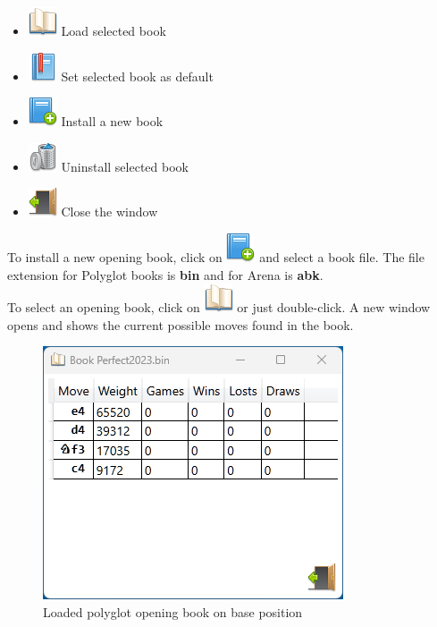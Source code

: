 \documentclass[11pt,a4paper]{article}
\begin{document}
	\begin{itemize}
		\item \includegraphics[scale=0.5]{book_open.png} Load selected book
		\item \includegraphics[scale=0.5]{bookmark.png} Set selected book as default
		\item \includegraphics[scale=0.5]{book_add.png} Install a new book
		\item \includegraphics[scale=0.5]{bin.png} Uninstall selected book
		\item \includegraphics[scale=0.5]{door_out.png} Close the window
	\end{itemize}
	
	To install a new opening book, click on \includegraphics[scale=0.5]{book_add.png} and select a book file. The file extension for Polyglot books is \textbf{bin} and for Arena is \textbf{abk}.\\

	To select an opening book, click on \includegraphics[scale=0.5]{book_open.png} or just double-click. 
	A new window opens and shows the current possible moves found in the book.
	
	\begin{figure}[H]
		\centering
		\includegraphics[scale=1.0]{OpeningBook.png}
		\caption{Loaded polyglot opening book on base position }
		\label{fig:OpeningBook}
	\end{figure}
	
\end{document}
